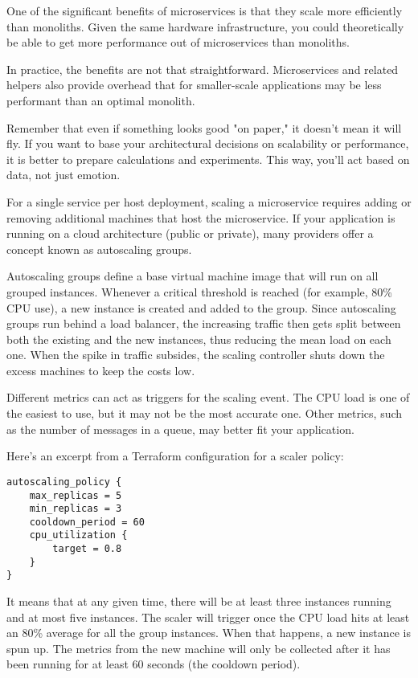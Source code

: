 
One of the significant benefits of microservices is that they scale more efficiently than monoliths. Given the same hardware infrastructure, you could theoretically be able to get more performance out of microservices than monoliths.

In practice, the benefits are not that straightforward. Microservices and related helpers also provide overhead that for smaller-scale applications may be less performant than an optimal monolith.

Remember that even if something looks good "on paper," it doesn't mean it will fly. If you want to base your architectural decisions on scalability or performance, it is better to prepare calculations and experiments. This way, you'll act based on data, not just emotion.


For a single service per host deployment, scaling a microservice requires adding or removing additional machines that host the microservice. If your application is running on a cloud architecture (public or private), many providers offer a concept known as autoscaling groups.

Autoscaling groups define a base virtual machine image that will run on all grouped instances. Whenever a critical threshold is reached (for example, 80\% CPU use), a new instance is created and added to the group. Since autoscaling groups run behind a load balancer, the increasing traffic then gets split between both the existing and the new instances, thus reducing the mean load on each one. When the spike in traffic subsides, the scaling controller shuts down the excess machines to keep the costs low.

Different metrics can act as triggers for the scaling event. The CPU load is one of the easiest to use, but it may not be the most accurate one. Other metrics, such as the number of messages in a queue, may better fit your application.

Here's an excerpt from a Terraform configuration for a scaler policy:

\begin{lstlisting}[style=styleCXX]
autoscaling_policy {
	max_replicas = 5
	min_replicas = 3
	cooldown_period = 60
	cpu_utilization {
		target = 0.8
	}
}
\end{lstlisting}

It means that at any given time, there will be at least three instances running and at most five instances. The scaler will trigger once the CPU load hits at least an 80\% average for all the group instances. When that happens, a new instance is spun up. The metrics from the new machine will only be collected after it has been running for at least 60 seconds (the cooldown period).

